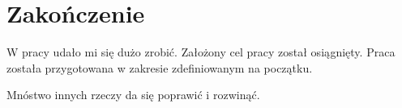 
\chapter*{Zakończenie}

W pracy udało mi się dużo zrobić. Założony cel pracy został osiągnięty. Praca została przygotowana w zakresie zdefiniowanym na początku. \lipsum[17]


Mnóstwo innych rzeczy da się poprawić i rozwinąć. \lipsum[23]